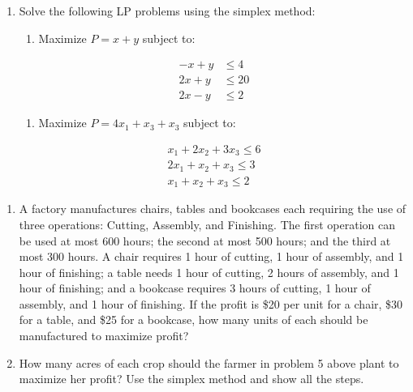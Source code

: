 \documentclass[
  letterpaper,
  DIV=11,
  numbers=noendperiod]{scrreprt}
\providecommand{\tightlist}{%
  \setlength{\itemsep}{0pt}\setlength{\parskip}{0pt}}\usepackage{longtable,booktabs,array}
\begin{document}
\begin{enumerate}
\def\labelenumi{\arabic{enumi})}
\setcounter{enumi}{5}
\item
  Solve the following LP problems using the simplex method:

  \begin{enumerate}
  \def\labelenumii{\alph{enumii})}
  \tightlist
  \item
    Maximize \(P=x+y\) subject to:
  \end{enumerate}

  \begin{align}
  -x+y &\le4 \\
  2x+y &\le20\\
  2x-y &\le2
  \end{align}

  \begin{enumerate}
  \def\labelenumii{\alph{enumii})}
  \setcounter{enumii}{1}
  \tightlist
  \item
    Maximize \(P = 4x_1 + x_3 + x_3\) subject to:
  \end{enumerate}

  \begin{align}
   x_1 + 2x_2 + 3x_3 \le 6\\
   2x_1 + x_2 + x_3 \le3 \\
   x_1 + x_2 + x_3 \le2
  \end{align}
\end{enumerate}

\begin{enumerate}
\def\labelenumi{\arabic{enumi}.}
\setcounter{enumi}{6}
\item
  A factory manufactures chairs, tables and bookcases each requiring the
  use of three operations: Cutting, Assembly, and Finishing. The first
  operation can be used at most 600 hours; the second at most 500 hours;
  and the third at most 300 hours. A chair requires 1 hour of cutting, 1
  hour of assembly, and 1 hour of finishing; a table needs 1 hour of
  cutting, 2 hours of assembly, and 1 hour of finishing; and a bookcase
  requires 3 hours of cutting, 1 hour of assembly, and 1 hour of
  finishing. If the profit is \$20 per unit for a chair, \$30 for a
  table, and \$25 for a bookcase, how many units of each should be
  manufactured to maximize profit?
\item
  How many acres of each crop should the farmer in problem 5 above plant
  to maximize her profit? Use the simplex method and show all the steps.
\end{enumerate}
\end{document}

